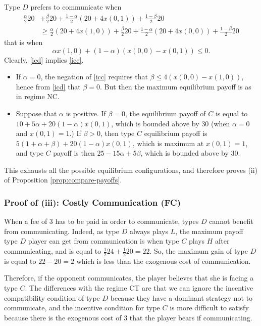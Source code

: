 \documentclass[12pt]{article}
\theoremstyle{break}
\begin{document}
\begin{enumerate}[(a)]
\begin{equation}
\end{equation}
%
Type $D$ prefers to communicate when
%
\begin{align*}
	\frac{\alpha}{2}20&+\frac{\beta}{2}20+\frac{1-\alpha}{2}(20+4x(0,1))+\frac{1-\beta}{2}20\\ 
	&\geq \frac{\alpha}{2}(20+4x(1,0))+\frac{\beta}{2}20+\frac{1-\alpha}{2}(20+4x(0,0))+\frac{1-\beta}{2}20
\end{align*}
%
that is when%
\begin{equation}\label{icd}
	\alpha x(1,0)+(1-\alpha)(x(0,0)-x(0,1))\leq 0.
\end{equation}
%
Clearly, \eqref{icd} implies \eqref{icc}. 
\begin{itemize}
	\item If $\alpha=0$, the negation of \eqref{icc} requires that $\beta\leq 4(x(0,0)-x(1,0))$, hence from \eqref{icd} that $\beta=0$. But then the maximum equilibrium payoff is as in regime NC.
	\item  Suppose that $\alpha$ is positive. If $\beta=0$, the equilibrium payoff of $C$ is equal to $10+5\alpha+20(1-\alpha)x(0,1)$, which is bounded above by $30$ (when $\alpha=0$ and $x(0,1)=1$.) If $\beta>0$, then type $C$ equilibrium payoff is $5(1+\alpha+\beta)+20(1-\alpha)x(0,1)$, which is maximum at $x(0,1)=1$, and type $C$ payoff is then $25-15\alpha+5\beta$, which is bounded above by $30$.
\end{itemize}

\end{enumerate}

This exhausts all the possible equilibrium configurations, and therefore proves (ii) of Proposition \ref{prop:compare-payoffs}.


\subsubsection*{Proof of (iii): Costly Communication (FC)}
When a fee of $3$ has to be paid in order to communicate, types $D$ cannot benefit from communicating. Indeed, as type $D$ always plays $L$, the maximum payoff type $D$ player can get from communication is when type $C$ plays $H$ after communicating, and is equal to $\frac{1}{2}24 +\frac{1}{2}20=22$. So, the maximum gain of type $D$ is equal to $22-20=2$ which is less than the exogenous cost of communication.

Therefore, if the opponent communicates, the player believes that she is facing a type $C$. The differences with the regime CT are that we can ignore the incentive compatibility condition of type $D$ because they have a dominant strategy not to communicate, and the incentive condition for type $C$ is more difficult to satisfy because there is the exogenous cost of $3$ that the player bears if communicating.  
\end{document}
